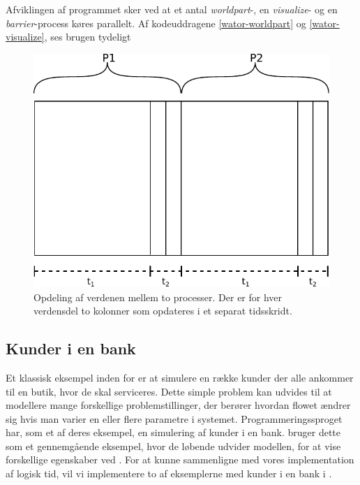 Afviklingen af programmet sker ved at et antal \emph{worldpart}-, en 
\emph{visualize}- og en \emph{barrier}-process køres parallelt. Af 
kodeuddragene \autoref{wator-worldpart} og \ref{wator-visualize}, ses brugen 
tydeligt 


\begin{figure}[hbtp] \begin{center}
  \includegraphics[scale=0.75]{images/wator}
  \caption{Opdeling af verdenen mellem to processer. Der er for hver verdensdel 
  to kolonner som opdateres i et separat tidsskridt.}
  \label{fig:wator}
  \end{center}
\end{figure}

\subsection{Kunder i en bank}\label{bank-eksempel}
Et klassisk eksempel inden for \des er at simulere  
en række kunder der alle ankommer til en butik, hvor de skal serviceres. Dette 
simple problem kan udvides til at modellere mange forskellige 
problemstillinger, der berører hvordan flowet ændrer sig hvis man varier en eller flere parametre
i systemet. Programmeringssproget \simpy{}har, som et af deres eksempel, en 
simulering af kunder i en bank. \simpy bruger dette som et gennemgående 
eksempel, hvor de løbende udvider modellen, for at vise forskellige 
egenskaber ved \simpy. For at kunne sammenligne \simpy  med vores 
implementation af logisk tid, vil vi implementere to af eksemplerne med kunder i en bank i \pycsp.


